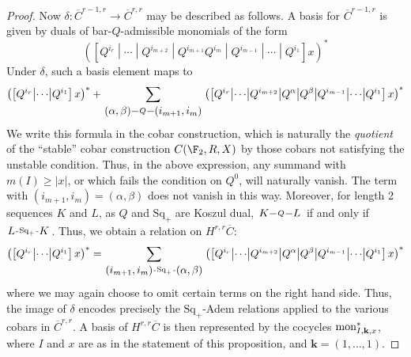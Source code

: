 \documentclass[10pt]{article}
\makeatletter
\newcommand{\produces}[3]{{#1}{#3}{#2}}
\renewcommand{\Q}{Q}
\newcommand{\SqShift}{\Sq_{+}}
\newcommand{\Sq}{\mathrm{Sq}}
\newcommand{\DyerLashov}{R}
\newcommand{\minDim}{m}
\newcommand{\BarMonomial}[3]{\textup{mon}_{#1,#2,#3}}
\renewcommand{\produces}[3]{
{
\def\labelstyle{\scriptstyle}
\xymatrix@C=2em@1{
{#1}
\ar@{-}[r]|-{{\,#3\,}}
&%
{#2}%
}}}
\makeatother
\begin{document}
\begin{KoszulComplexes_n>1}
\begin{proof}
Now $\delta:\overline{C}^{r-1,r}\to\overline{C}^{r,r}$ may be described as follows. A basis for $\overline{C}^{r-1,r}$ is given by duals of bar-$\Q$-admissible monomials of the form
\[\left(\left[\Q^{i_r}\middle|\cdots\middle|\Q^{i_{m+2}}  \middle|\Q^{i_{m+1}}\Q^{i_m}\middle|\Q^{i_{m-1}}\middle|\cdots \middle|\Q^{i_1} \right]x\right)^*\]
Under $\delta$, such a basis element maps to
\[
\left(\left[\Q^{i_r}\middle|\cdots \middle|\Q^{i_1} \right]x\right)^*
+
\sum_{\produces{(\alpha,\beta)}{(i_{m+1},i_m)}{\Q}}\left(\left[\Q^{i_r}\middle|\cdots\middle|\Q^{i_{m+2}}  \middle|\Q^{\alpha}\middle|\Q^{\beta}\middle|\Q^{i_{m-1}}\middle|\cdots \middle|\Q^{i_1} \right]x\right)^*\]
We write this formula in the cobar construction, which is naturally the \emph{quotient} of the ``stable'' cobar construction $C(\F_2,\DyerLashov,X)$ by those cobars not satisfying the unstable condition. Thus, in the above expression, any summand with $\minDim(I)\geq|x|$, or which fails the condition on $\Q^0$, will naturally vanish.
%
The term with $(i_{m+1},i_m)=(\alpha,\beta)$ does not vanish in this way. Moreover, for length 2 sequences $K$ and $L$, as $\Q$ and $\SqShift$ are Koszul dual, $\produces{K}{L}{\Q}$ if and only if $\produces{L}{K}{\SqShift}$. Thus, we obtain a relation on $H^{r,r}\overline{C}$:
\[\left(\left[\Q^{i_r}\middle|\cdots \middle|\Q^{i_1} \right]x\right)^*
=
\sum_{\produces{(i_{m+1},i_m)}{(\alpha,\beta)}{\SqShift}}\left(\left[\Q^{i_r}\middle|\cdots\middle|\Q^{i_{m+2}}  \middle|\Q^{\alpha}\middle|\Q^{\beta}\middle|\Q^{i_{m-1}}\middle|\cdots \middle|\Q^{i_1} \right]x\right)^*\]
where we may again choose to omit certain terms on the right hand side. Thus, the image of $\delta$ encodes precisely the $\SqShift$-Adem relations applied to the various cobars in $\overline{C}^{r,r}$. %
A basis of $H^{r,r}\overline{C}$ is then represented by the cocycles $\BarMonomial{I}{\textbf{k}}{x}^*$, where $I$ and $x$ are as in the statement of this proposition, and $\textbf{k}=(1,\ldots,1)$.


\end{proof}
\end{KoszulComplexes_n>1}
\end{document}
